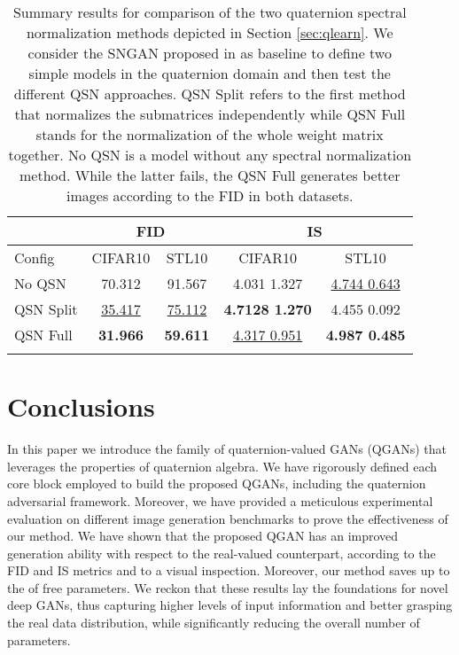 \documentclass[graybox]{svmult}
\begin{document}
\begin{table}[t]
\caption{Summary results for comparison of the two quaternion spectral normalization methods depicted in Section \ref{sec:qlearn}. We consider the SNGAN proposed in \cite{Miyato2018SpectralNF} as baseline to define two simple models in the quaternion domain and then test the different QSN approaches. QSN Split refers to the first method that normalizes the submatrices independently while QSN Full stands for the normalization of the whole weight matrix together. No QSN is a model without any spectral normalization method. While the latter fails, the QSN Full generates better images according to the FID in both datasets.}
\centering
\begin{tabular}{@{}lcccc@{}}
\hline\noalign{\smallskip}
          & \multicolumn{2}{c}{FID }           & \multicolumn{2}{c}{IS }                              \\ \midrule
Config    & CIFAR10         & STL10           & CIFAR10                   & STL10                   \\
No QSN    & 70.312          &  91.567         & 4.031  1.327 &  \underline{4.744  0.643}          \\
QSN Split & \underline{35.417}          & \underline{75.112}          & \textbf{4.7128  1.270} & 4.455  0.092           \\
QSN Full  & \textbf{31.966} & \textbf{59.611} & \underline{4.317  0.951}            & \textbf{4.987  0.485} \\ 
\noalign{\smallskip}\hline\noalign{\smallskip}
\end{tabular}
\label{tab:qsn_tab}
\end{table}

\section{Conclusions}
\label{sec:conc}
\noindent In this paper we introduce the family of quaternion-valued GANs (QGANs) that leverages the properties of quaternion algebra. We have rigorously defined each core block employed to build the proposed QGANs, including the quaternion adversarial framework. Moreover, we have provided a meticulous experimental evaluation on different image generation benchmarks to prove the effectiveness of our method. We have shown that the proposed QGAN has an improved generation ability with respect to the real-valued counterpart, according to the FID and IS metrics and to a visual inspection. Moreover, our method saves up to the  of free parameters. We reckon that these results lay the foundations for novel deep GANs, thus capturing higher levels of input information and better grasping the real data distribution, while significantly reducing the overall number of parameters.



\end{document}
